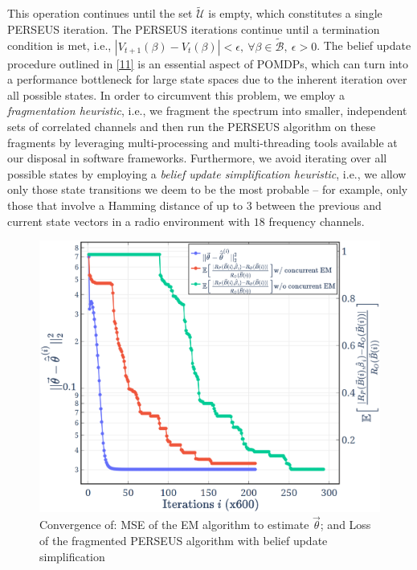 \documentclass[10pt,twocolumn]{IEEEtran}
\begin{document}
This operation continues until the set $\tilde{\mathcal{U}}$ is empty, which constitutes a single PERSEUS iteration. The PERSEUS iterations continue until a termination condition is met, i.e., $|V_{t{+}1}(\beta){-}V_{t}(\beta)|{<}\epsilon,\ \forall \beta{\in} \tilde{\mathcal{B}},\ \epsilon{>}0$. The belief update procedure outlined in \eqref{11} is an essential aspect of POMDPs, which can turn into a performance bottleneck for large state spaces due to the inherent iteration over all possible states. In order to circumvent this problem, we employ a \emph{fragmentation heuristic}, i.e., we fragment the spectrum into smaller, independent sets of correlated channels and then run the PERSEUS algorithm on these fragments by leveraging multi-processing and multi-threading tools available at our disposal in software frameworks. Furthermore, we avoid iterating over all possible states by employing a \emph{belief update simplification heuristic}, i.e., we allow only those state transitions we deem to be the most probable -- for example, only those that involve a Hamming distance of up to $3$ between the previous and current state vectors in a radio environment with $18$ frequency channels.
\begin{figure}[t]
    \centering
    \includegraphics[width=0.9\linewidth]{Evaluation_1.png}
    \caption{Convergence of: MSE of the EM algorithm to estimate $\vec{\theta}$; and Loss of the fragmented PERSEUS algorithm with belief update simplification}
    \label{fig:4}
    \vspace{-6mm}
\end{figure}
\vspace{-3mm}
\end{document}

